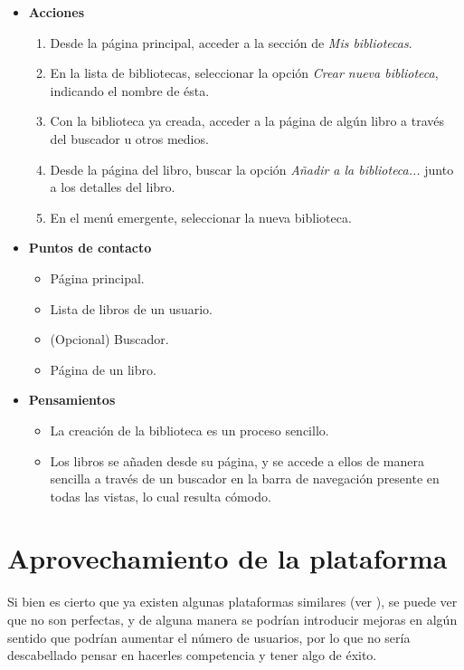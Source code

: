 \begin{itemize}
    \item \textbf{Acciones}
    \begin{enumerate}
        \item Desde la página principal, acceder a la sección de \textit{Mis bibliotecas}.
        \item En la lista de bibliotecas, seleccionar la opción \textit{Crear nueva biblioteca}, indicando el nombre de ésta.
        \item Con la biblioteca ya creada, acceder a la página de algún libro a través del buscador u otros medios.
        \item Desde la página del libro, buscar la opción \textit{Añadir a la biblioteca...} junto a los detalles del libro.
        \item En el menú emergente, seleccionar la nueva biblioteca.
    \end{enumerate}
\item \textbf{Puntos de contacto}
    \begin{itemize}
        \item Página principal.
        \item Lista de libros de un usuario.
        \item (Opcional) Buscador.
        \item Página de un libro.
    \end{itemize}
\item \textbf{Pensamientos}
    \begin{itemize}
        \item La creación de la biblioteca es un proceso sencillo.
        \item Los libros se añaden desde su página, y se accede a ellos de manera sencilla a través de un buscador en la barra de navegación presente en todas las vistas, lo cual resulta cómodo.
    \end{itemize}
\end{itemize}

\section{Aprovechamiento de la plataforma}
Si bien es cierto que ya existen algunas plataformas similares (ver ), se puede ver que no son perfectas, y de alguna manera se podrían introducir mejoras en algún sentido que podrían aumentar el número de usuarios, por lo que no sería descabellado pensar en hacerles competencia y tener algo de éxito.

